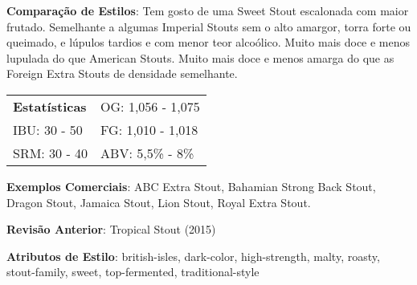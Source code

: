 \textbf{Comparação de Estilos}: Tem gosto de uma Sweet Stout escalonada com maior frutado. Semelhante a algumas Imperial Stouts sem o alto amargor, torra forte ou queimado, e lúpulos tardios e com menor teor alcoólico. Muito mais doce e menos lupulada do que American Stouts. Muito mais doce e menos amarga do que as Foreign Extra Stouts de densidade semelhante.

\begin{tabular}{@{}p{35mm}p{35mm}@{}}
  \textbf{Estatísticas} & OG: 1,056 - 1,075 \\
  IBU: 30 - 50  & FG: 1,010 - 1,018  \\
  SRM: 30 - 40  & ABV: 5,5\% - 8\%
\end{tabular}

\textbf{Exemplos Comerciais}: ABC Extra Stout, Bahamian Strong Back Stout, Dragon Stout, Jamaica Stout, Lion Stout, Royal Extra Stout.

\textbf{Revisão Anterior}: Tropical Stout (2015)

\textbf{Atributos de Estilo}: british-isles, dark-color, high-strength, malty, roasty, stout-family, sweet, top-fermented, traditional-style
